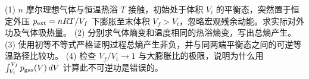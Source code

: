 (1) \(n\) 摩尔理想气体与恒温热浴 \(T\) 接触，初始处于体积 \(V_i\) 的平衡态，突然置于恒定外压 \(p_{\rm ext}=nRT/V_f\) 下膨胀至末体积 \(V_f>V_i\)，忽略宏观残余动能。求实际对外功及气体吸热量。
(2) 分别求气体熵变和温度相同的热浴熵变，写出总熵产生。
(3) 使用初等不等式严格证明过程总熵产生非负，并与同两端平衡态之间的可逆等温路径比较功。
(4) 检查 \(V_f/V_i\to1\) 与大膨胀比的极限，说明为什么用 \(\int_{V_i}^{V_f}p_{\rm gas}(V)\,dV\) 计算此不可逆功是错误的。
